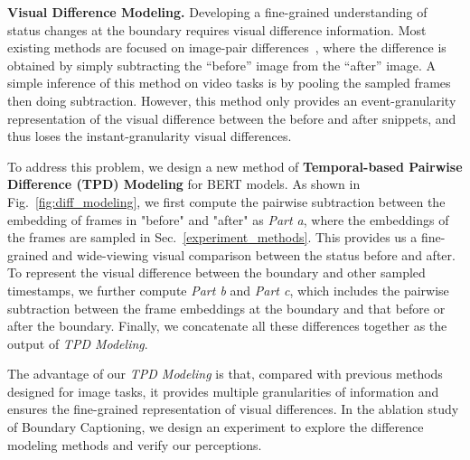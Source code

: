 \documentclass[runningheads]{llncs}
\begin{document}
\textbf{Visual Difference Modeling.}
Developing a fine-grained understanding of status changes at the boundary requires visual difference information. 
Most existing methods are focused on image-pair differences~\cite{park2019robust}, where the difference is obtained by simply subtracting the “before” image from the “after” image. 
A simple inference of this method on video tasks is by pooling the sampled frames then doing subtraction. 
However, this method only provides an event-granularity representation of the visual difference between the before and after snippets, and thus loses the instant-granularity visual differences. 

To address this problem, we design a new method of \textbf{Temporal-based Pairwise Difference (TPD) Modeling} for BERT models. 
As shown in Fig.~\ref{fig:diff_modeling}, we first compute the pairwise subtraction between the embedding of frames in "before" and "after" as \textit{Part a}, where the embeddings of the frames are sampled in Sec.~\ref{experiment_methods}.
This provides us a fine-grained and wide-viewing visual comparison between the status before and after. 
To represent the visual difference between the boundary and other sampled timestamps, we further compute \textit{Part b} and \textit{Part c}, which includes the pairwise subtraction between the frame embeddings at the boundary and that before or after the boundary. 
Finally, we concatenate all these differences together as the output of \textit{TPD Modeling}.

The advantage of our \textit{TPD Modeling} is that, compared with previous methods designed for image tasks, it provides multiple granularities of information and ensures the fine-grained representation of visual differences. 
In the ablation study of Boundary Captioning, we design an experiment to explore the difference modeling methods and verify our perceptions.
\end{document}
